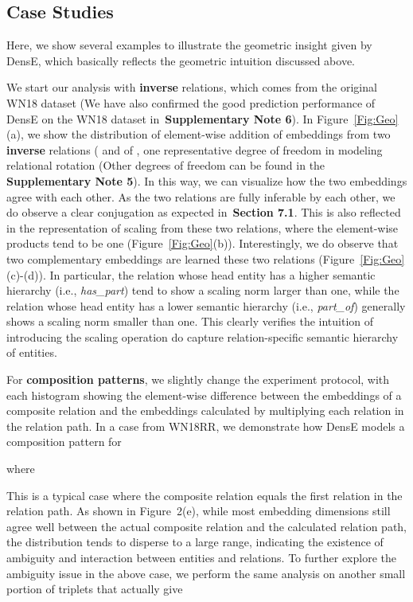 \documentclass[11pt]{article}
\begin{document}
\subsection{Case Studies}
Here, we show several examples to illustrate the geometric insight given by DensE, which basically reflects the geometric intuition discussed above. 

We start our analysis with \textbf{inverse} relations, which comes from the original WN18 dataset (We have also confirmed the good prediction performance of DensE on the WN18 dataset in~\textbf{Supplementary Note 6}). In Figure~\ref{Fig:Geo}(a), we show the distribution of element-wise addition of embeddings from two \textbf{inverse} relations ( and  of , one representative degree of freedom in modeling relational rotation (Other degrees of freedom can be found in the \textbf{Supplementary Note 5}). In this way, we can visualize how the two embeddings agree with each other. As the two relations are fully inferable by each other, we do observe a clear conjugation as expected in~\textbf{Section 7.1}. This is also reflected in the representation of scaling from these two relations, where the element-wise products tend to be one (Figure~\ref{Fig:Geo}(b)). Interestingly, we do observe that two complementary embeddings are learned these two relations (Figure~\ref{Fig:Geo}(c)-(d)). In particular, the relation whose head entity has a higher semantic hierarchy (i.e., \textit{has\_part}) tend to show a scaling norm  larger than one, while the relation whose head entity has a lower semantic hierarchy (i.e., \textit{part\_of}) generally shows a scaling norm  smaller than one. This clearly verifies the intuition of introducing the scaling operation do capture relation-specific semantic hierarchy of entities.

For \textbf{composition patterns}, we slightly change the experiment protocol, with each histogram showing the element-wise difference between the embeddings of a composite relation and the embeddings calculated by multiplying each relation in the relation path. In a case from WN18RR, we demonstrate how DensE models a composition pattern for

\noindent where

This is a typical case where the composite relation equals the first relation in the relation path. As shown in Figure~2(e), while most embedding dimensions still agree well between the actual composite relation and the calculated relation path, the distribution tends to disperse to a large range, indicating the existence of ambiguity and interaction between entities and relations. To further explore the ambiguity issue in the above case, we perform the same analysis on another small portion of triplets that actually give
\end{document}
